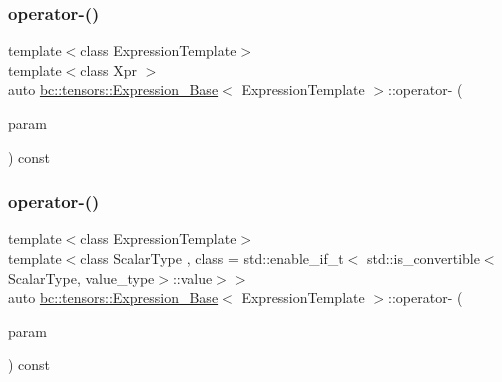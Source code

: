 \subsubsection{\texorpdfstring{operator-\/()}{operator-()}\hspace{0.1cm}{\footnotesize\ttfamily [1/3]}}
{\footnotesize\ttfamily template$<$class Expression\+Template$>$ \\
template$<$class Xpr $>$ \\
auto \hyperlink{classbc_1_1tensors_1_1Expression__Base}{bc\+::tensors\+::\+Expression\+\_\+\+Base}$<$ Expression\+Template $>$\+::operator-\/ (\begin{DoxyParamCaption}\item[{const \hyperlink{classbc_1_1tensors_1_1Expression__Base}{Expression\+\_\+\+Base}$<$ Xpr $>$ \&}]{param }\end{DoxyParamCaption}) const\hspace{0.3cm}{\ttfamily [inline]}}

\mbox{\label{classbc_1_1tensors_1_1Expression__Base_a602ef44919b1d284261041b65f6cda5f}} 
\subsubsection{\texorpdfstring{operator-\/()}{operator-()}\hspace{0.1cm}{\footnotesize\ttfamily [2/3]}}
{\footnotesize\ttfamily template$<$class Expression\+Template$>$ \\
template$<$class Scalar\+Type , class  = std\+::enable\+\_\+if\+\_\+t$<$   std\+::is\+\_\+convertible$<$\+Scalar\+Type, value\+\_\+type$>$\+::value$>$$>$ \\
auto \hyperlink{classbc_1_1tensors_1_1Expression__Base}{bc\+::tensors\+::\+Expression\+\_\+\+Base}$<$ Expression\+Template $>$\+::operator-\/ (\begin{DoxyParamCaption}\item[{const Scalar\+Type \&}]{param }\end{DoxyParamCaption}) const\hspace{0.3cm}{\ttfamily [inline]}}

\mbox{\label{classbc_1_1tensors_1_1Expression__Base_afde819cdc43552c581d600dbe07eaa89}} 
